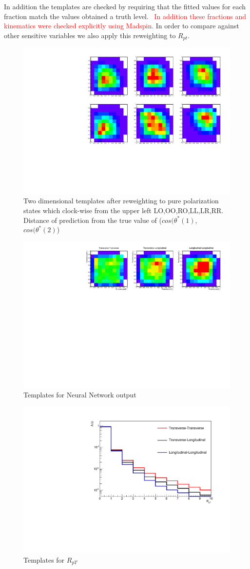\documentclass[10pt,twocolumn]{article}
\def\ts{\ensuremath{ \theta^{*} }\xspace}
\def\ctsnb{\ensuremath{ cos(\ts }\xspace}
\begin{document}
In addition the templates are checked by requiring that the fitted values for each fraction match the values obtained a truth level. ~\textcolor{red}{In addition these fractions and kinematics were checked explicitly using Madspin.} In order to compare against other sensitive variables we also apply this reweighting to $R_{pt}$.

\begin{figure}
\includegraphics[width=.45\textwidth]{./fig/2D_temps.pdf}

\caption{Two dimensional templates after reweighting to pure polarization states which clock-wise from the upper left LO,OO,RO,LL,LR,RR.
\label{fig:mlp_err} Distance of prediction from the true value of ($\ctsnb(1)$,$\ctsnb(2)$)}
\end{figure}


\begin{figure}
\includegraphics[width=.45\textwidth]{./fig/templates.pdf}
\caption{Templates for Neural Network output }
\end{figure}


\begin{figure}
\includegraphics[width=.45\textwidth]{./fig/templates_2D.pdf}
\caption{Templates for $R_{pT}$}
\end{figure}
\end{document}
